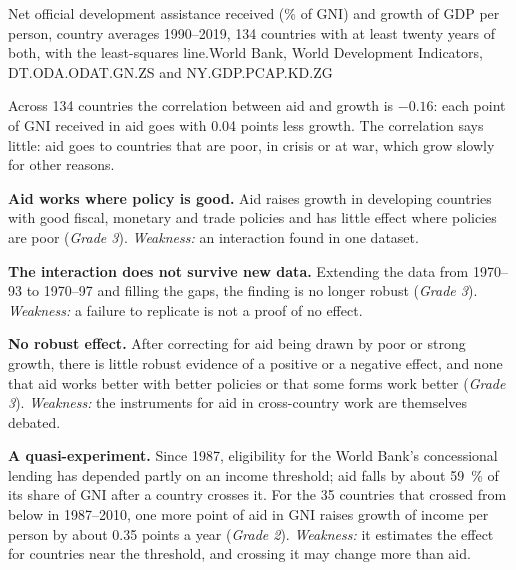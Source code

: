 \begin{omchart}{Net official development assistance received (\% of GNI) and growth of GDP
per person, country averages 1990--2019, 134 countries with at least twenty years of both, with the least-squares line.}{World Bank, World Development Indicators,
DT.ODA.ODAT.GN.ZS and NY.GDP.PCAP.KD.ZG}
\end{omchart}

Across 134 countries the correlation between aid and growth is $-0.16$: each point of GNI received in aid goes
with 0.04 points less growth. The correlation says little: aid goes to countries that are poor,
in crisis or at war, which grow slowly for other reasons.

\begin{debate}
\textbf{Aid works where policy is good.} Aid raises growth in developing countries
with good fiscal, monetary and trade policies and has little effect where policies
are poor (\emph{Grade 3}). %
\emph{Weakness:} an interaction found in one dataset.

\textbf{The interaction does not survive new data.} Extending the data from 1970--93 to 1970--97 and filling
the gaps, the finding is no longer robust (\emph{Grade 3}). %
\emph{Weakness:} a failure to replicate is not a proof of no effect.

\textbf{No robust effect.} After correcting for aid being drawn by poor or strong
growth, there is little robust evidence of a positive or a negative effect, and none that
aid works better with better policies or that some forms work better (\emph{Grade 3}). %
\emph{Weakness:} the instruments for aid in cross-country work are themselves
debated.

\textbf{A quasi-experiment.} Since 1987, eligibility for the World Bank's concessional
lending has depended partly on an income threshold; aid falls by about 59~\% of its share of GNI after a
country crosses it. For the 35 countries that crossed from below in 1987--2010, one more point of aid in GNI raises
growth of income per person by about 0.35 points a year (\emph{Grade 2}). %
\emph{Weakness:} it estimates the effect for countries near the threshold, and
crossing it may change more than aid.
\end{debate}

